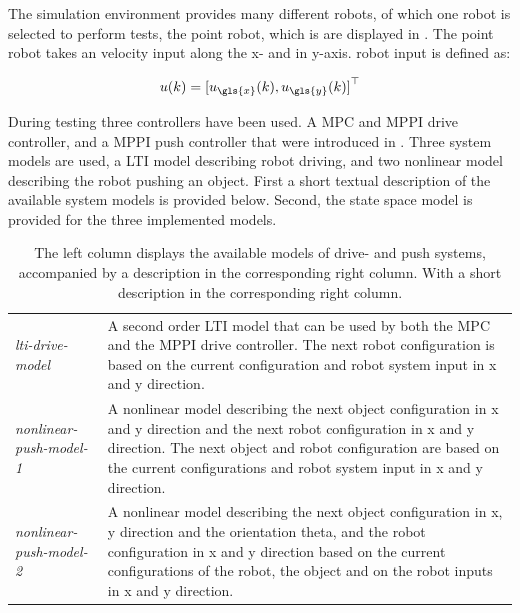 The simulation environment provides many different robots, of which one robot is selected to perform tests, the point robot, which is are displayed in . The point robot takes an velocity input along the \gls{x}- and in \gls{y}-axis.\bs
robot input is defined as:\bs

\[ u(k) = {[ u_{\gls{x}}(k), u_{\gls{y}}(k) ]}^\top \]


During testing three controllers have been used. A \ac{MPC} and \ac{MPPI} drive controller, and a \ac{MPPI} push controller that were introduced in . Three system models are used, a \ac{LTI} model describing robot driving, and two nonlinear model describing the robot pushing an object. First a short textual description of the available system models is provided below. Second, the state space model is provided for the three implemented models.\bs


\begin{table}[H]
\centering
\begin{tabular}%
  {>{\raggedright\arraybackslash}p{}%
   >{\raggedright\arraybackslash}p{}}
\textit{lti-drive-model} & A second order \ac{LTI} model that can be used by both the \ac{MPC} and the \ac{MPPI} drive controller. The next robot configuration is based on the current configuration and robot system input in \gls{x} and \gls{y} direction. \\
\textit{nonlinear-push-model-1} & A nonlinear model describing the next object configuration in \gls{x} and \gls{y} direction and the next robot configuration in \gls{x} and \gls{y} direction. The next object and robot configuration are based on the current configurations and robot system input in \gls{x} and \gls{y} direction.\\
\textit{nonlinear-push-model-2} & A nonlinear model describing the next object configuration in \gls{x}, \gls{y} direction and the orientation \gls{theta}, and the robot configuration in \gls{x} and \gls{y} direction based on the current configurations of the robot, the object and on the robot inputs in \gls{x} and \gls{y} direction.\\
\end{tabular}
\caption{The left column displays the available models of drive- and push systems, accompanied by a description in the corresponding right column. With a short description in the corresponding right column.}\label{table:available_system_models}
\end{table}

